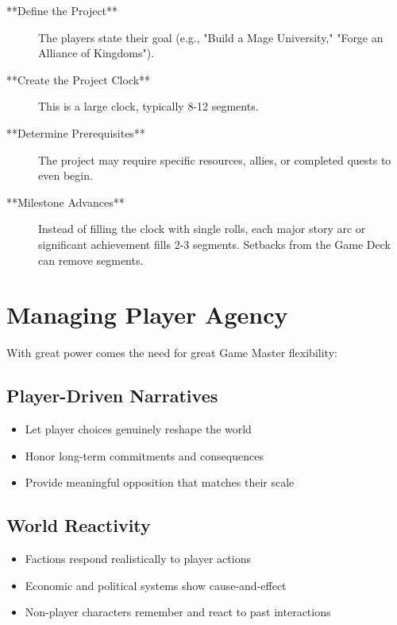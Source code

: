 \begin{description}
    \item[**Define the Project**] The players state their goal (e.g., "Build a Mage University," "Forge an Alliance of Kingdoms").
    \item[**Create the Project Clock**] This is a large clock, typically 8-12 segments.
    \item[**Determine Prerequisites**] The project may require specific resources, allies, or completed quests to even begin.
    \item[**Milestone Advances**] Instead of filling the clock with single rolls, each major story arc or significant achievement fills 2-3 segments. Setbacks from the Game Deck can remove segments.
\end{description}

\section{Managing Player Agency}

With great power comes the need for great Game Master flexibility:

\subsection*{Player-Driven Narratives}

\begin{itemize}
    \item Let player choices genuinely reshape the world
    \item Honor long-term commitments and consequences
    \item Provide meaningful opposition that matches their scale
\end{itemize}

\subsection*{World Reactivity}

\begin{itemize}
    \item Factions respond realistically to player actions
    \item Economic and political systems show cause-and-effect
    \item Non-player characters remember and react to past interactions
\end{itemize}

